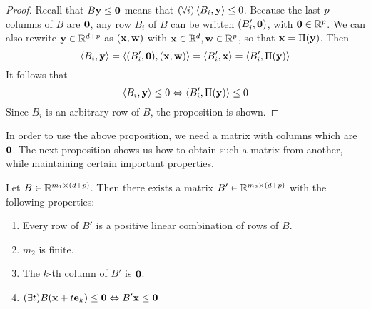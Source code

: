 \begin{proof}
	Recall that $B\mathbf{y} \leq \mathbf{0}$ means that $(\forall i)\left\langle B_i, \mathbf{y} \right\rangle \leq 0$.  Because the last $p$ columns of $B$ are $\mathbf{0}$, any row $B_i$ of $B$ can be written $(B'_i,\mathbf{0})$, with $\mathbf{0} \in \mathbb{R}^p$.  We can also rewrite $\mathbf{y}\in\mathbb{R}^{d+p}$ as $(\mathbf{x},\mathbf{w})$ with $\mathbf{x}\in\mathbb{R}^d,\mathbf{w}\in\mathbb{R}^p$, so that $\mathbf{x} = \Pi(\mathbf{y})$.  Then
	\[ \left\langle B_i, \mathbf{y} \right\rangle = \left\langle (B'_i,\mathbf{0}), (\mathbf{x},\mathbf{w}) \right\rangle = \left\langle B'_i, \mathbf{x} \right\rangle = \left\langle B'_i, \Pi(\mathbf{y}) \right\rangle \]
	It follows that
	\[ \left\langle B_i, \mathbf{y} \right\rangle \leq 0 \Leftrightarrow \left\langle B'_i, \Pi(\mathbf{y}) \right\rangle \leq 0 \]
	Since $B_i$ is an arbitrary row of $B$, the proposition is shown.
\end{proof}

In order to use the above proposition, we need a matrix with columns which are $\mathbf{0}$.  The next proposition shows us how to obtain such a matrix from another, while maintaining certain important properties.

\begin{Prop}\label{fm_hcone}
	Let ${B \in \mathbb{R}^{m_1\times (d+p)}}$.  Then there exists a matrix $B' \in \mathbb{R}^{m_2\times (d+p)}$ with the following properties:
	\begin{enumerate}
		\item Every row of $B'$ is a positive linear combination of rows of $B$.
		\item $m_2$ is finite.
		\item The $k$-th column of $B'$ is $\mathbf{0}$.
		\item \((\exists t)B(\mathbf{x} + t\mathbf{e}_k) \leq \mathbf{0} \Leftrightarrow B'\mathbf{x} \leq \mathbf{0}\)
	\end{enumerate}
\end{Prop}

